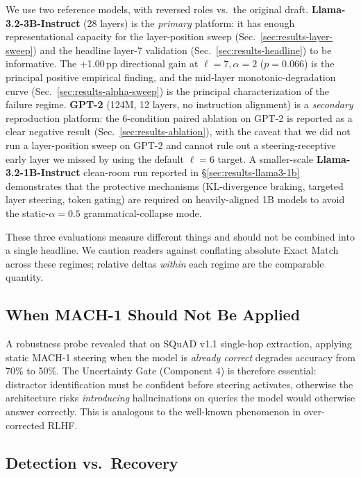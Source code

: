 \documentclass[conference]{IEEEtran}
\begin{document}
We use two reference models, with reversed roles vs.\ the original draft. \textbf{Llama-3.2-3B-Instruct} (28 layers) is the \emph{primary} platform: it has enough representational capacity for the layer-position sweep (Sec.~\ref{sec:results-layer-sweep}) and the headline layer-7 validation (Sec.~\ref{sec:results-headline}) to be informative. The +1.00\,pp directional gain at $\ell\!=\!7,\alpha\!=\!2$ ($p\!=\!0.066$) is the principal positive empirical finding, and the mid-layer monotonic-degradation curve (Sec.~\ref{sec:results-alpha-sweep}) is the principal characterization of the failure regime. \textbf{GPT-2} (124M, 12 layers, no instruction alignment) is a \emph{secondary} reproduction platform: the 6-condition paired ablation on GPT-2 is reported as a clear negative result (Sec.~\ref{sec:results-ablation}), with the caveat that we did not run a layer-position sweep on GPT-2 and cannot rule out a steering-receptive early layer we missed by using the default $\ell\!=\!6$ target. A smaller-scale \textbf{Llama-3.2-1B-Instruct} clean-room run reported in §\ref{sec:results-llama3-1b} demonstrates that the protective mechanisms (KL-divergence braking, targeted layer steering, token gating) are required on heavily-aligned 1B models to avoid the static-$\alpha\!=\!0.5$ grammatical-collapse mode.

These three evaluations measure different things and should not be combined into a single headline. We caution readers against conflating absolute Exact Match across these regimes; relative deltas \emph{within} each regime are the comparable quantity.

\subsection{When MACH-1 Should Not Be Applied}

A robustness probe revealed that on SQuAD v1.1 single-hop extraction, applying static MACH-1 steering when the model is \emph{already correct} degrades accuracy from 70\% to 50\%. The Uncertainty Gate (Component 4) is therefore essential: distractor identification must be confident before steering activates, otherwise the architecture risks \emph{introducing} hallucinations on queries the model would otherwise answer correctly. This is analogous to the well-known phenomenon in over-corrected RLHF.

\subsection{Detection vs.\ Recovery}
\end{document}
